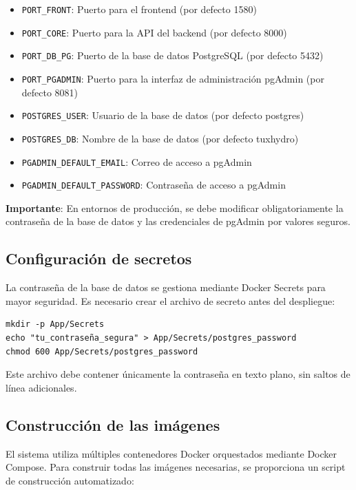 \begin{itemize}
    \item \texttt{PORT\_FRONT}: Puerto para el frontend (por defecto 1580)
    \item \texttt{PORT\_CORE}: Puerto para la API del backend (por defecto 8000)
    \item \texttt{PORT\_DB\_PG}: Puerto de la base de datos PostgreSQL (por defecto 5432)
    \item \texttt{PORT\_PGADMIN}: Puerto para la interfaz de administración pgAdmin (por defecto 8081)
    \item \texttt{POSTGRES\_USER}: Usuario de la base de datos (por defecto postgres)
    \item \texttt{POSTGRES\_DB}: Nombre de la base de datos (por defecto tuxhydro)
    \item \texttt{PGADMIN\_DEFAULT\_EMAIL}: Correo de acceso a pgAdmin
    \item \texttt{PGADMIN\_DEFAULT\_PASSWORD}: Contraseña de acceso a pgAdmin
\end{itemize}

\textbf{Importante}: En entornos de producción, se debe modificar obligatoriamente la contraseña de la base de datos y las credenciales de pgAdmin por valores seguros.

\subsection{Configuración de secretos}
\label{subsec:chp7-2-3}

La contraseña de la base de datos se gestiona mediante Docker Secrets para mayor seguridad. Es necesario crear el archivo de secreto antes del despliegue:

\begin{lstlisting}[style=bash]
mkdir -p App/Secrets
echo "tu_contraseña_segura" > App/Secrets/postgres_password
chmod 600 App/Secrets/postgres_password
\end{lstlisting}

Este archivo debe contener únicamente la contraseña en texto plano, sin saltos de línea adicionales.

\subsection{Construcción de las imágenes}
\label{subsec:chp7-2-4}

El sistema utiliza múltiples contenedores Docker orquestados mediante Docker Compose. Para construir todas las imágenes necesarias, se proporciona un script de construcción automatizado:

